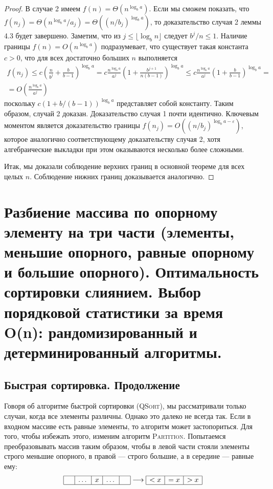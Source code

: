 \documentclass[a4paper,12pt]{article}
\begin{document}
\begin{proof}
	 В случае 2 имеем \(f(n) = \Theta(n^{\log_b a})\).
	 Если мы сможем показать, что \(f(n_j) = \Theta(n^{\log_b a}/a_j) = \Theta((n/b_j)^{\log_b a})\), то 
	 доказательство случая 2 леммы 4.3 будет завершено. Заметим, что из \(j \leqslant \lfloor \log_b n \rfloor\)
	 следует \(b^j/n \leqslant 1\). Наличие границы \(f(n) = O(n^{\log_b a})\) подразумевает, что 
	 существует такая константа \(c > 0\), что для всех достаточно больших \(n\) выполняется
	 \begin{multline*}
	 	f(n_j) \leqslant c\left(\frac{n}{b^j} + \frac{b}{b - 1}\right)^{\log_b a} = c\frac{n^{\log_b a}}{a^j}\left(1 + \frac{b^{j + 1}}{n(b -1)}\right)^{\log_b a} \leqslant c\frac{n^{\log_b a}}{a^j}\left(1 + \frac{b}{b -1}\right)^{\log_b a} = \\ = O\left(\frac{n^{\log_b a}}{a^j}\right)
	 \end{multline*}
	 поскольку \(c(1 + b/(b - 1))^{\log_b a}\) представляет собой константу. Таким образом, случай 2 доказан. Доказательство случая 1 почти идентично. Ключевым моментом является доказательство границы \(f(n_j) = O((n/b_j)^{\log_b a - \varepsilon})\), которое аналогично соответствующему доказательству случая 2, хотя алгебраические выкладки при
	 этом оказываются несколько более сложными.
	 
	 Итак, мы доказали соблюдение верхних границ в основной теореме для всех целых \(n\). Соблюдение нижних границ доказывается аналогично.
\end{proof}

\newpage
\section{Разбиение массива по опорному элементу на три части (элементы, меньшие опорного, равные опорному и большие опорного). Оптимальность сортировки слиянием. Выбор порядковой статистики за время O(n): рандомизированный и детерминированный алгоритмы.}

\subsection{Быстрая сортировка. Продолжение}
Говоря об алгоритме быстрой сортировки (\textsc{QSort}), мы рассматривали только случаи, когда все элементы различны. Однако это далеко не всегда так. Если в входном массиве есть равные элементы, то алгоритм может застопориться. Для того, чтобы избежать этого, изменим алгоритм \textsc{Partition}. Попытаемся преобразовывать массив таким образом, чтобы в левой части стояли элементы строго меньшие опорного, в правой --- строго большие, а в середине --- равные ему:
\[\begin{array}{|c|c|c|c|c|}
	\hline
	\phantom{x}  & \dots & x & \dots & \phantom{x}  \\
	\hline
\end{array}
\longrightarrow
\begin{array}{|c|c|c|}
    \hline
    <x&=x&>x\\
    \hline
\end{array}\]
\end{document}
